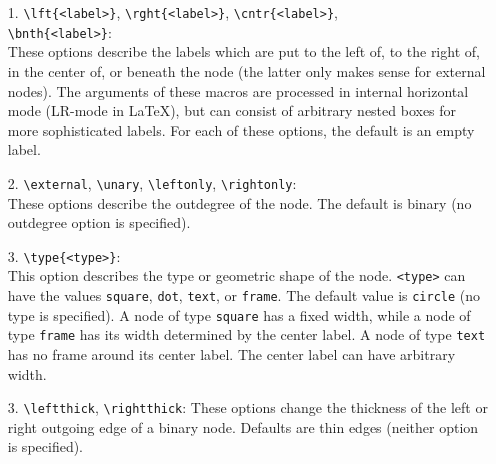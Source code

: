 \begin{enumerate}                                                               
\item[1.] \verb.\lft{<label>}., \verb.\rght{<label>}.,                          
     \verb.\cntr{<label>}.,\\\verb.\bnth{<label>}.:\\                           
     These options describe the labels which are put to the left of, to the     
     right of, in the                                                           
     center of, or beneath the node (the latter only makes sense for            
     external nodes). The arguments of these macros are processed in            
     internal horizontal mode (LR-mode in \LaTeX), but can consist of           
     arbitrary nested boxes for more sophisticated labels. For each of          
     these options, the default is an empty label.                              
                                                                                
\item[2.] \verb.\external., \verb.\unary.,                                      
     \verb.\leftonly., \verb.\rightonly.:\\                                     
     These options describe the outdegree                                       
     of the node.                                   
     The default is binary (no outdegree option is specified).                  
                                                                                
\item[3.] \verb.\type{<type>}.:\\                                               
     This option describes the type or geometric shape of the node.             
     \verb.<type>. can have the values \verb.square.,                         
     \verb.dot., \verb.text., or \verb.frame.. 
     The default value is \verb.circle. (no type is specified). A node of type
     \verb.square. has a fixed width, while a node of type \verb.frame. has its
     width determined by the center label. A node of type \verb.text. has no frame
     around its center label. The center label can have arbitrary width.

\item[3.] \verb.\leftthick., \verb.\rightthick.:
     These options change the thickness of the left or right outgoing edge of
     a binary node. Defaults are thin edges (neither option is specified).      
                                                                                

\end{enumerate}
